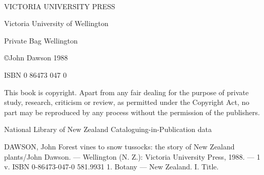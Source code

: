 \thispagestyle{empty}

~\vfill

VICTORIA UNIVERSITY PRESS

Victoria University of Wellington

Private Bag Wellington

©John Dawson 1988

ISBN 0 86473 047 0


This book is copyright. Apart from any fair dealing for the purpose of private study, research, criticism or review, as permitted under the Copyright Act, no part may be reproduced by any process without the permission of the publishers.

National Library of New Zealand
Cataloguing-in-Publication data

DAWSON, John
Forest vines to snow tussocks: the story of New Zealand plants/John Dawson. --- Wellington
(N. Z.): Victoria University Press, 1988. --- 1 v.
ISBN 0-86473-047-0
581.9931
1. Botany --- New Zealand. I. Title.
